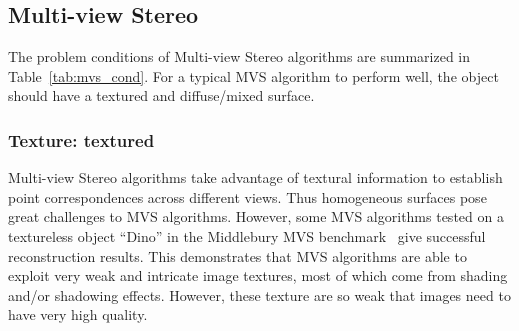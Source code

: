 \subsection{Multi-view Stereo}
The problem conditions of Multi-view Stereo algorithms are summarized in Table~\ref{tab:mvs_cond}. For a typical MVS algorithm to perform well, the object should have a textured and diffuse/mixed surface.

\subsubsection{Texture: textured}
Multi-view Stereo algorithms take advantage of textural information to establish point correspondences across different views. Thus homogeneous surfaces pose great challenges to MVS algorithms. However, some MVS algorithms tested on a textureless object ``Dino'' in the Middlebury MVS benchmark~\cite{seitz2006comparison} give successful reconstruction results. This demonstrates that MVS algorithms are able to exploit very weak and intricate image textures, most of which come from shading and/or shadowing effects. However, these texture are so weak that images need to have very high quality.


